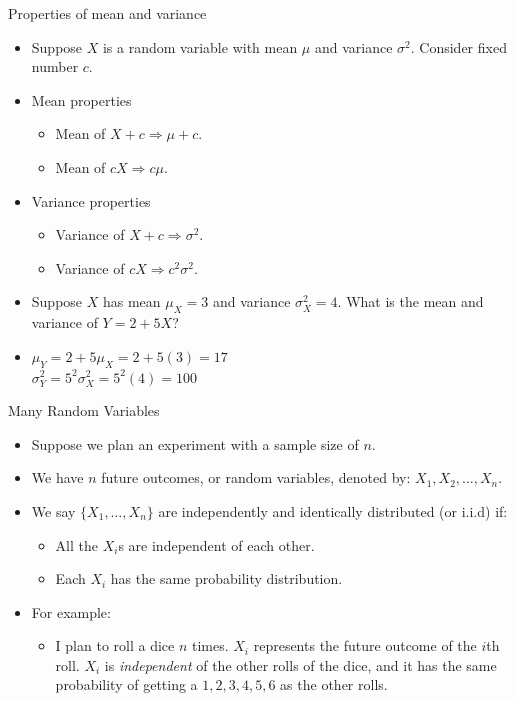\documentclass[10pt, handout, xcolor=table]{beamer}
\newcommand*\themecol{\usebeamercolor[fg]{structure}}
\begin{document}
\begin{frame}{Properties of mean and variance}

\begin{itemize}\itemsep3ex
\item<1-> Suppose $X$ is a random variable with mean $\mu$ and variance $\sigma^2$. Consider fixed number $c$.
\item<2-> Mean properties
\begin{itemize}
\item<2-> Mean of $X + c \Longrightarrow \mu + c$.
\item<2-> Mean of $cX \Longrightarrow c\mu$.
\end{itemize}
\item<3-> Variance properties
\begin{itemize}
\item<3-> Variance of $X+c \Longrightarrow \sigma^2$.
\item<3-> Variance of $cX \Longrightarrow c^2 \sigma^2$.
\end{itemize}
\item<4->[Q3:] Suppose $X$ has mean $\mu_X = 3$ and variance $\sigma^2_X = 4$. What is the mean and variance of $Y = 2+5X$?
\item<5->[A3:] {\color{red} $\mu_Y = 2+5\mu_X = 2+5(3) = 17$\\
\medskip
$\sigma^2_Y = 5^2 \sigma^2_X = 5^2(4) = 100$
}
\end{itemize}

\end{frame}

\begin{frame}{Many Random Variables}
\begin{itemize}
\setlength{\itemsep}{15pt}
\item<1-> Suppose we plan an experiment with a {\themecol sample size} of $n$. 
\item<2-> We have $n$ future outcomes, or random variables, denoted by: $X_1, X_2, \dots, X_n$.
\item<3-> We say $\{X_1,\dots, X_n\}$ are {\themecol independently and identically distributed (or i.i.d)} if:
\begin{itemize}
\setlength{\itemsep}{10pt}
\vspace{0.25cm}
\item All the $X_i$s are independent of each other.
\item Each $X_i$ has the same probability distribution.
\end{itemize}
\item<4-> For example:
\begin{itemize}
\item \color{blue!70} I plan to roll a dice $n$ times. $X_i$ represents the future outcome of the $i$th roll. $X_i$ is \emph{independent} of the other rolls of the dice, and it has the same probability of getting a $1, 2, 3, 4, 5, 6$ as the other rolls.
\end{itemize}
\end{itemize}
\end{frame}
\end{document}
